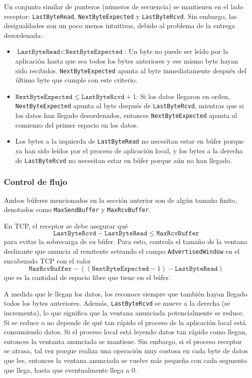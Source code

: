 Un conjunto similar de punteros (números de secuencia) se mantienen en el lado receptor: \texttt{LastByteRead}, \texttt{NextByteExpected} y \texttt{LastByteRcvd}. Sin embargo, las desigualdades son un poco menos intuitivas, debido al problema de la entrega desordenada:
\begin{itemize}
  \item \(\texttt{LastByteRead} < \texttt{NextByteExpected}\): Un byte no puede ser leído por la aplicación hasta que sea todos los bytes anteriores y ese mismo byte hayan sido recibidos. \texttt{NextByteExpected} apunta al byte inmediatamente después del último byte que cumple con este criterio.
  \item \(\texttt{NextByteExpected} \leq \texttt{LastByteRcvd} + 1\): Si los datos llegaron en orden, \texttt{NextByteExpected} apunta al byte después de \texttt{LastByteRcvd}, mientras que si los datos han llegado desordenados, entonces \texttt{NextByteExpected} apunta al comienzo del primer espacio en los datos.
  \item Los bytes a la izquierda de \texttt{LastByteRead} no necesitan estar en búfer porque ya han sido leídos por el proceso de aplicación local, y los bytes a la derecha de \texttt{LastByteRcvd} no necesitan estar en búfer porque aún no han llegado.
\end{itemize}

\subsubsection*{Control de flujo}
Ambos búferes mencionados en la sección anterior son de algún tamaño finito, denotados como \texttt{MaxSendBuffer} y \texttt{MaxRcvBuffer}.

En TCP, el receptor se debe asegurar qué \[\texttt{LastByteRcvd} - \texttt{LastByteRead} \leq \texttt{MaxRcvBuffer}\]
para evitar la sobrecarga de su búfer. Para esto, controla el tamaño de la ventana deslizante que anuncia al remitente seteando el campo \texttt{AdvertisedWindow} en el encabezado TCP con el valor \[\texttt{MaxRcvBuffer} - ((\texttt{NextByteExpected}-1)-\texttt{LastByteRead})\]
que es la cantidad de espacio libre que tiene en el búfer.

A medida que le llegan los datos, los reconoce siempre que también hayan llegado todos los bytes anteriores. Además, \texttt{LastByteRcvd} se mueve a la derecha (se incrementa), lo que significa que la ventana anunciada potencialmente se reduce. Si se reduce o no depende de qué tan rápido el proceso de la aplicación local está consumiendo datos. Si el proceso local está leyendo datos tan rápido como llegan, entonces la ventanta anunciada se mantiene. Sin embargo, si el proceso receptor se atrasa, tal vez porque realiza una operación muy costosa en cada byte de datos que lee, entonces la ventana anunciada se vuelve más pequeña con cada segmento que llega, hasta que eventualmente llega a 0.

